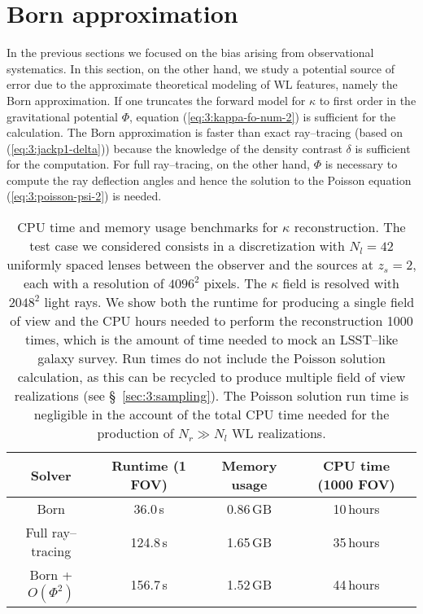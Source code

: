 \section{Born approximation}
\label{sec:7:born}
In the previous sections we focused on the bias arising from observational systematics. In this section, on the other hand, we study a potential source of error due to the approximate theoretical modeling of WL features, namely the Born approximation. If one truncates the forward model for $\kappa$ to first order in the gravitational potential $\Phi$, equation (\ref{eq:3:kappa-fo-num-2}) is sufficient for the calculation. The Born approximation is faster than exact ray--tracing (based on (\ref{eq:3:jackp1-delta})) because the knowledge of the density contrast $\delta$ is sufficient for the computation. For full ray--tracing, on the other hand, $\Phi$ is necessary to compute the ray deflection angles and hence the solution to the Poisson equation (\ref{eq:3:poisson-psi-2}) is needed. 
%
\begin{table}
\begin{center}
\begin{tabular}{c|c|c|c}
\textbf{Solver} & \textbf{Runtime (1 FOV)} & \textbf{Memory usage} & \textbf{CPU time (1000 FOV)} \\ \hline \hline
Born & 36.0\,s & 0.86\,GB & 10\,hours  \\
Full ray--tracing & 124.8\,s & 1.65\,GB & 35\,hours  \\
Born + $O(\Phi^2)$ & 156.7\,s & 1.52\,GB & 44\,hours \\ \hline
\end{tabular}
\end{center}
\caption{CPU time and memory usage benchmarks for $\kappa$ reconstruction. The test case we considered consists in a discretization with $N_l=42$ uniformly spaced lenses between the observer and the sources at $z_s=2$, each with a resolution of $4096^2$ pixels. The $\kappa$ field is resolved with $2048^2$ light rays. We show both the runtime for producing a single field of view and the CPU hours needed to perform the reconstruction 1000 times, which is the amount of time needed to mock an LSST--like galaxy survey. Run times do not include the Poisson solution calculation, as this can be recycled to produce multiple field of view realizations (see \S~\ref{sec:3:sampling}). The Poisson solution run time is negligible in the account of the total CPU time needed for the production of $N_r\gg N_l$ WL realizations.}
\label{tab:7:benchmarks}
\end{table}
